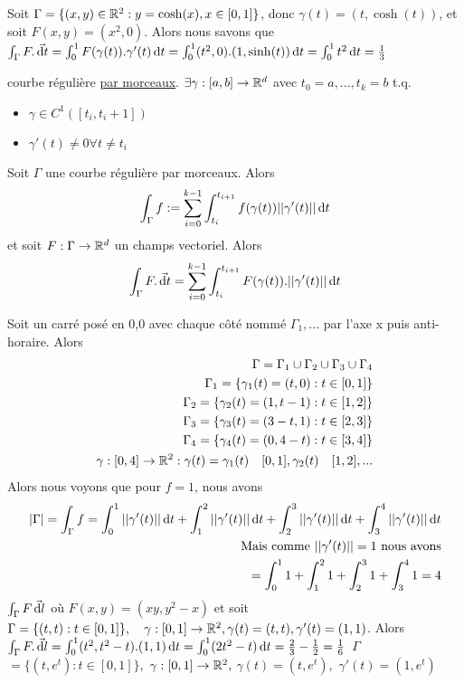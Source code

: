\documentclass[12pt,a4paper]{article}
\begin{document}
 Soit $\Gamma = \{(x,y) \in \mathbb{R}^2 : y = \cosh(x), x\in [0,1]\}$, donc $\gamma(t) = (t,\cosh(t))$, et soit $F(x,y) = (x^2,0)$. Alors nous savons que $\int_\Gamma F. \vec{\, \mathrm d t} =  \int_0^1F(\gamma(t)).\gamma'(t)\, \mathrm d t = \int_0^1 (t^2, 0).(1,\sinh(t)) \, \mathrm d t = \int_0^1 t^2 \, \mathrm d t = \frac{1}{3}$
\begin{boite}
	 courbe régulière \uline{par morceaux}. $\exists \gamma : [a,b] \to \mathbb{R}^d$ avec $t_0=a,...,t_k = b$ t.q. 
	\begin{itemize}
		\item	$\gamma \in C^1 ([t_i,t_i+1])$
		\item 	$\gamma'(t) \neq 0 \forall t\neq t_i$
	\end{itemize}
	
	 Soit $\Gamma$ une courbe régulière par morceaux. Alors 
	\[\int_\Gamma f := \sum_{i=0}^{k-1} \int_{t_i}^{t_{i+1}} f(\gamma(t)) ||\gamma'(t)|| \, \mathrm d t\]
	et soit $F : \Gamma \to \mathbb{R}^d$ un champs vectoriel. Alors 
	\[\int_\Gamma F.\vec{\, \mathrm d t} = \sum_{i=0}^{k-1} \int_{t_i}^{t_{i+1}} F(\gamma(t)).||\gamma'(t)|| \, \mathrm d t\]
\end{boite}
 Soit un carré posé en 0,0 avec chaque côté nommé $\Gamma_1,...$ par l'axe x puis anti-horaire. Alors 
\begin{align*}
\Gamma = \Gamma_1 \cup \Gamma_2 \cup \Gamma_3 \cup \Gamma_4\\
\Gamma_1 = \{\gamma_1(t) = (t,0) :  t\in [0,1]\}\\
\Gamma_2 = \{\gamma_2(t) = (1,t-1) :  t\in [1,2]\}\\
\Gamma_3 = \{\gamma_3(t) = (3-t,1) :  t\in [2,3]\}\\
\Gamma_4 = \{\gamma_4(t) = (0,4-t) :  t\in [3,4]\}\\
\gamma : [0,4] \to \mathbb{R}^2 : \gamma(t) = \gamma_1(t)\quad [0,1], \gamma_2(t) \quad [1,2], ...
\end{align*}
Alors nous voyons que pour $f=1$, nous avons 
\begin{align*}
|\Gamma| = \int_\Gamma f = \int_0^1 ||\gamma'(t)|| \, \mathrm d t + \int_1^2 ||\gamma'(t)|| \, \mathrm d t + \int_2^3||\gamma'(t)|| \, \mathrm d t + \int_3^4 ||\gamma'(t)|| \, \mathrm d t\\
\mbox{Mais comme } ||\gamma'(t)|| = 1 \mbox{ nous avons}\\
= \int_0^1 1 + \int_1^2 1 + \int_2^3 1 + \int_3^4 1 = 4
\end{align*}
 $\int_\Gamma F \vec{\, \mathrm d l}$ où $F(x,y) = (xy, y^2-x)$ et soit $\Gamma = \{(t,t) : t\in [0,1]\},\quad \gamma : [0,1] \to \mathbb{R}^2, \gamma(t) = (t,t), \gamma'(t) = (1,1)$. Alors $\int_\Gamma F.\vec{\, \mathrm d l} = \int_0^1 (t^2, t^2-t).(1,1) \, \mathrm d t = \int_0^1 (2t^2-t)\, \mathrm d t = \frac{2}{3}-\frac{1}{2} = \frac{1}{6}$\
\^{$\Gamma$} $= \{(t,e^t) : t \in [0,1]\},$ \^{$\gamma$} $: [0,1] \to \mathbb{R}^2,$ \^{$\gamma$}$(t) = (t,e^t),$ \^{$\gamma'$}$(t) = (1,e^t)$
\end{document}
